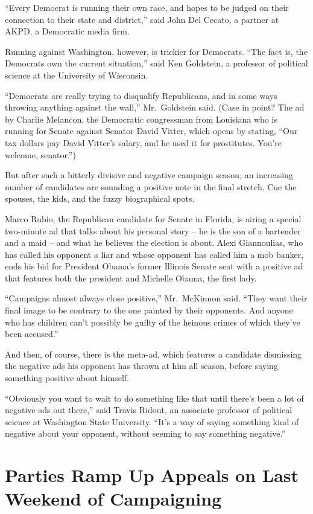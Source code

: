 ﻿\documentclass[12pt]{article}
\begin{document}
``Every Democrat is running their own race, and hopes to be judged on their connection to their
state and district,'' said John Del Cecato, a partner at AKPD, a Democratic media firm.

Running against Washington, however, is trickier for Democrats. ``The fact is, the Democrats own the
current situation,'' said Ken Goldstein, a professor of political science at the University of
Wisconsin.

``Democrats are really trying to disqualify Republicans, and in some ways throwing anything against
the wall,'' Mr.~Goldstein said. (Case in point? The ad by Charlie Melancon, the Democratic
congressman from Louisiana who is running for Senate against Senator David Vitter, which opens by
stating, ``Our tax dollars pay David Vitter's salary, and he used it for prostitutes. You're
welcome, senator.'')

But after such a bitterly divisive and negative campaign season, an increasing number of candidates
are sounding a positive note in the final stretch. Cue the spouses, the kids, and the fuzzy
biographical spots.

Marco Rubio, the Republican candidate for Senate in Florida, is airing a special two-minute ad that
talks about his personal story -- he is the son of a bartender and a maid -- and what he believes
the election is about. Alexi Giannoulias, who has called his opponent a liar and whose opponent has
called him a mob banker, ends his bid for President Obama's former Illinois Senate seat with a
positive ad that features both the president and Michelle Obama, the first lady.

``Campaigns almost always close positive,'' Mr.~McKinnon said. ``They want their final image to be
contrary to the one painted by their opponents. And anyone who has children can't possibly be guilty
of the heinous crimes of which they've been accused.''

And then, of course, there is the meta-ad, which features a candidate dismissing the negative ads
his opponent has thrown at him all season, before saying something positive about himself.

``Obviously you want to wait to do something like that until there's been a lot of negative ads out
there,'' said Travis Ridout, an associate professor of political science at Washington State
University. ``It's a way of saying something kind of negative about your opponent, without seeming
to say something negative.''

\section{Parties Ramp Up Appeals on Last Weekend of Campaigning}
\end{document}
